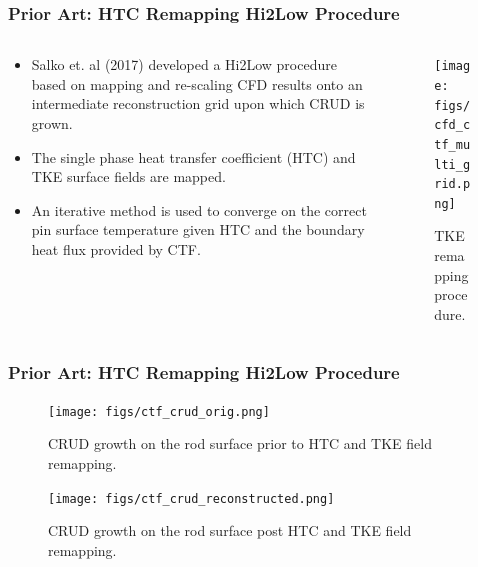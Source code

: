 \documentclass[t, pdftex]{beamer}
\begin{document}
\begin{frame}[shrink=10]
    \frametitle{Prior Art: HTC Remapping Hi2Low Procedure}
\begin{columns}
\begin{column}{0.5\textwidth}
   \begin{itemize}
   \item Salko et. al (2017) developed a Hi2Low procedure based on mapping and re-scaling CFD results onto an intermediate reconstruction grid upon which CRUD is grown.
   \item The single phase heat transfer coefficient (HTC) and TKE surface fields are mapped.
   \item An iterative method is used to converge on the correct pin surface temperature given HTC and the boundary heat flux provided by CTF.
   \end{itemize}
\end{column}
\begin{column}{0.5\textwidth}  %
    \begin{center}
    \begin{figure}
     \texttt{[image: figs/cfd\_ctf\_multi\_grid.png]}
     \caption{TKE remapping procedure.}      
    \end{figure}
     \end{center}
\end{column}
\end{columns}
\end{frame}

\begin{frame}
    \frametitle{Prior Art: HTC Remapping Hi2Low Procedure}
    \begin{figure}[!htbp]
\centering
\begin{minipage}{.5\textwidth}
  \texttt{[image: figs/ctf\_crud\_orig.png]}
\caption{CRUD growth on the rod surface prior to HTC and TKE field remapping.}
\label{fig:crud_pre_map}
\end{minipage}%
\begin{minipage}{.5\textwidth}
  \texttt{[image: figs/ctf\_crud\_reconstructed.png]}
\caption{CRUD growth on the rod surface post HTC and TKE field remapping.}
\label{fig:crud_post_map}
\end{minipage}
\end{figure}
\end{frame}
\end{document}
